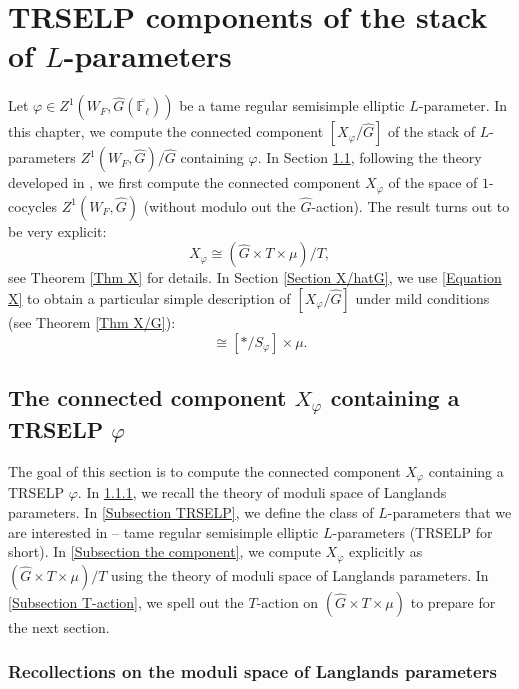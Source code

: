 


\chapter{TRSELP components of the stack of $L$-parameters} \label{Chapter MoLP}

    Let $\varphi \in Z^1(W_F, \hat{G}(\overline{\mathbb{F}_{\ell}}))$ be a tame regular semisimple elliptic $L$-parameter. In this chapter, we compute the connected component $[X_{\varphi}/\hat{G}]$ of the stack of $L$-parameters $Z^1(W_F, \hat{G})/\hat{G}$ containing $\varphi$. In Section \ref{Section X_phi}, following the theory developed in \cite[Section 3,4]{dat2022ihes}, we first compute the connected component $X_{\varphi}$ of the space of $1$-cocycles $Z^1(W_F, \hat{G})$ (without modulo out the $\hat{G}$-action).
    The result turns out to be very explicit:
    \begin{equation}\label{Equation X}
    	X_{\varphi} \cong (\hat{G} \times T \times \mu)/T,
    \end{equation}
    see Theorem \ref{Thm X} for details. In Section \ref{Section X/hatG}, we use \ref{Equation X} to obtain a particular simple description of $[X_{\varphi}/\hat{G}]$ under mild conditions (see Theorem \ref{Thm X/G}):
    \begin{equation}
    	[X_{\varphi}/\hat{G}] \cong [*/S_{\varphi}] \times \mu.
    \end{equation}
    
	\section{The connected component $X_{\varphi}$ containing a TRSELP $\varphi$}\label{Section X_phi}
	
	The goal of this section is to compute the connected component $X_{\varphi}$ containing a TRSELP $\varphi$. In \ref{Subsection MoLP}, we recall the theory of moduli space of Langlands parameters. In \ref{Subsection TRSELP}, we define the class of $L$-parameters that we are interested in -- tame regular semisimple elliptic $L$-parameters (TRSELP for short). In \ref{Subsection the component}, we compute $X_{\varphi}$ explicitly as $(\hat{G}\times T\times \mu)/T$ using the theory of moduli space of Langlands parameters. In \ref{Subsection T-action}, we spell out the $T$-action on $(\hat{G}\times T\times \mu)$ to prepare for the next section.
	
	\subsection{Recollections on the moduli space of Langlands parameters}\label{Subsection MoLP}
	
